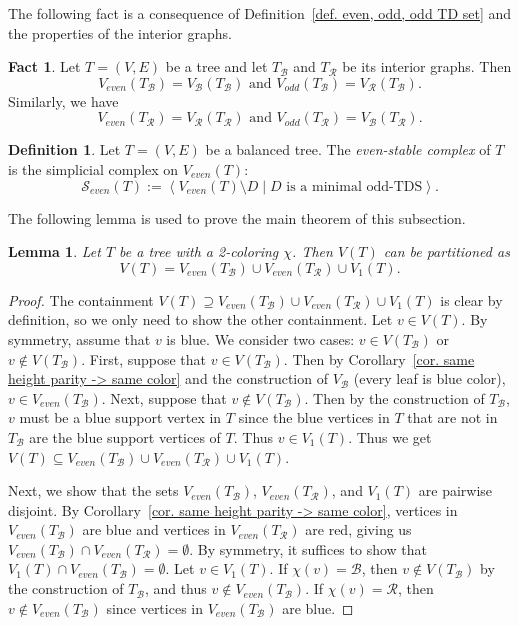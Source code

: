 \documentclass[12pt, reqno]{amsart}
\theoremstyle{definition}
\theoremstyle{plain}
\newtheorem{lemma}[theorem]{Lemma}
\theoremstyle{definition}
\newtheorem{fact}[theorem]{Fact}
\newtheorem{definition}[theorem]{Definition}
\newcommand{\R}{\mathcal{R}}
\newcommand{\B}{\mathcal{B}}
\newcommand\gen[1]{\left\langle #1 \right\rangle}
\newcommand{\calS}{\mathcal{S}}
\begin{document}
The following fact is a consequence of Definition~\ref{def. even, odd, odd TD set} and the properties of the interior graphs.

\begin{fact}\label{fact. odd-TDS is RD-set of TB}
   Let $T = (V,E)$ be a tree and let $T_\B$ and $T_\R$ be its interior graphs.
   Then
   $$
V_{even}(T_\B) = V_\B(T_\B) \mbox{ and } V_{odd}(T_\B) = V_\R(T_\B). 
$$
Similarly, we have
$$
V_{even}(T_\R) = V_\R(T_\R) \mbox{ and } V_{odd}(T_\R) = V_\B(T_\R). 
$$
\end{fact}


\begin{definition}\label{def. even stable complex of delta trees}
    Let $T = (V,E)$ be a balanced tree.
    The \emph{even-stable complex} of $T$ is the simplicial complex on $V_{even}(T)$:
    $$
    \calS_{even}(T) := \gen{V_{even}(T)\setminus D\mid D \text{ is a minimal odd-TDS}}.
    $$
\end{definition}

The following lemma is used to prove the main theorem of this subsection.

\begin{lemma}\label{lem. vert. partitioning of T}
    Let $T$ be a tree with a 2-coloring $\chi$. Then $V(T)$ can be partitioned as
    $$
    V(T) = V_{even}(T_\B) \cup V_{even}(T_\R) \cup V_1(T).
    $$
\end{lemma}

\begin{proof}
The containment $V(T) \supseteq V_{even}(T_\B) \cup V_{even}(T_\R) \cup V_1(T)$ is clear by definition, so we only need to show the other containment.
Let $v \in V(T)$.
By symmetry, assume that $v$ is blue.
We consider two cases: $v \in V(T_\B)$ or $v \not\in V(T_\B)$.
First, suppose that $v \in V(T_\B)$.
Then by Corollary~\ref{cor. same height parity -> same color} and the construction of $V_\B$ (every leaf is blue color), $v \in V_{even}(T_\B)$.
Next, suppose that $v \not\in V(T_\B)$.
Then by the construction of $T_\B$, $v$ must be a blue support vertex in $T$ since the blue vertices in $T$ that are not in $T_\B$ are the blue support vertices of $T$. 
Thus $v \in V_1(T)$.
Thus we get $V(T) \subseteq V_{even}(T_\B) \cup V_{even}(T_\R) \cup V_1(T)$.

Next, we show that the sets $V_{even}(T_\B)$, $V_{even}(T_\R)$, and $V_1(T)$ are pairwise disjoint.
By Corollary~\ref{cor. same height parity -> same color}, vertices in $V_{even}(T_\B)$ are blue and vertices in $V_{even}(T_\R)$ are red, giving us $V_{even}(T_\B) \cap V_{even}(T_\R) = \emptyset$.
By symmetry, it suffices to show that $V_1(T) \cap V_{even}(T_\B) = \emptyset$.
Let $v \in V_1(T)$.
If $\chi(v) = \B$, then $v \not\in V(T_\B)$ by the construction of $T_\B$, and thus $v \not\in V_{even}(T_\B)$.
If $\chi(v) = \R$, then $v \not\in V_{even}(T_\B)$ since vertices in $V_{even}(T_\B)$ are blue.
\end{proof}
\end{document}
